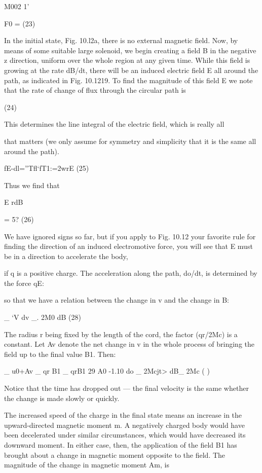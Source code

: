 {{M002
1'

F0 = (23)

In the initial state, Fig. 10.l2a, there is no external magnetic field.
Now, by means of some suitable large solenoid, we begin creating
a field B in the negative z direction, uniform over the whole region
at any given time. While this field is growing at the rate dB/dt, there
will be an induced electric field E all around the path, as indicated in
Fig. 10.1219. To find the magnitude of this field E we note that the
rate of change of flux through the circular path is

(24)

This determines the line integral of the electric field, which is really all

that matters (we only assume for symmetry and simplicity that it
is the same all around the path).

fE-dl=''Tfl‘fT1:=2wrE (25)

Thus we find that

E rdB

= 5? (26)

We have ignored signs so far, but if you apply to Fig. 10.12 your
favorite rule for finding the direction of an induced electromotive
force, you will see that E must be in a direction to accelerate the body,

if q is a positive charge. The acceleration along the path, do/dt, is
determined by the force qE:

so that we have a relation between the change in v and the change
in B:

_ ‘V
dv _. 2M0 dB (28)

The radius r being fixed by the length of the cord, the factor (qr/2Mc)
is a constant. Let Av denote the net change in v in the whole process
of bringing the field up to the final value B1. Then:

_ u0+Av _ qr B1 _ qrB1 29
A0 -1.10 do _ 2Mcjt> dB_ 2Mc ( )

Notice that the time has dropped out --- the final velocity is the same
whether the change is made slowly or quickly.

The increased speed of the charge in the final state means an increase
in the upward-directed magnetic moment m. A negatively
charged body would have been decelerated under similar 
circumstances, which would have decreased its downward moment. In
either case, then, the application of the field B1 has brought about
a change in magnetic moment opposite to the field. The magnitude
of the change in magnetic moment Am, is

}}

